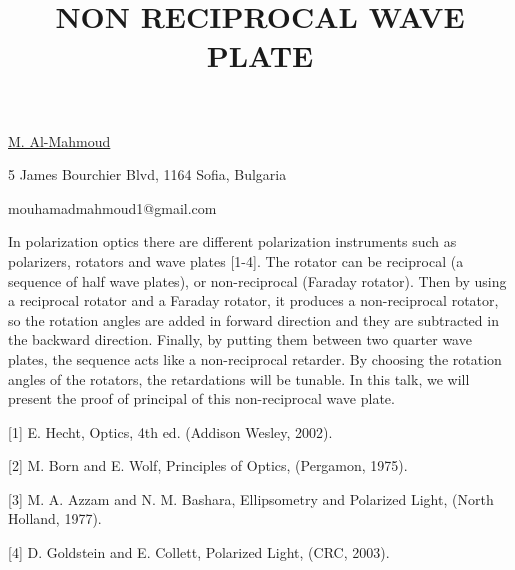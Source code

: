 \title{NON RECIPROCAL WAVE PLATE}

\underline{M. Al-Mahmoud}  

{\normalsize{\vspace{-4mm}
5 James Bourchier Blvd, 
1164 Sofia, 
Bulgaria



\email mouhamadmahmoud1@gmail.com}}

In polarization optics there are different polarization instruments such as polarizers, rotators and wave plates [1-4]. The rotator can be reciprocal (a sequence of half wave plates), or non-reciprocal (Faraday rotator). Then by using a reciprocal rotator and a Faraday rotator, it produces a non-reciprocal rotator, so the rotation angles are added in forward direction and they are subtracted in the backward direction.
Finally, by putting them between two quarter wave plates, the sequence acts like a non-reciprocal retarder. By choosing the rotation angles of the rotators, the retardations will be tunable. %
In this talk, we will present the proof of principal of this non-reciprocal wave plate.

{\normalsize
[1] E. Hecht, Optics, 4th ed. (Addison Wesley, 2002).
\vsp

[2] M. Born and E. Wolf, Principles of Optics, (Pergamon, 1975).
\vsp

[3] M. A. Azzam and N. M. Bashara, Ellipsometry and Polarized Light, (North Holland, 1977).
\vsp

[4] D. Goldstein and E. Collett, Polarized Light, (CRC, 2003).
}

\vspace{\baselineskip}